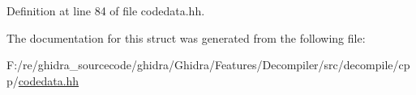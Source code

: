 Definition at line 84 of file codedata.\+hh.



The documentation for this struct was generated from the following file\+:\begin{DoxyCompactItemize}
\item 
F\+:/re/ghidra\+\_\+sourcecode/ghidra/\+Ghidra/\+Features/\+Decompiler/src/decompile/cpp/\mbox{\hyperlink{codedata_8hh}{codedata.\+hh}}\end{DoxyCompactItemize}
